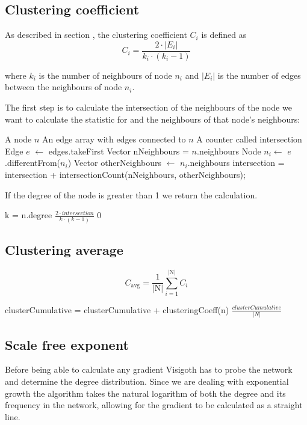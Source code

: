 \documentclass[a4paper,11pt,titlepage]{article}
\begin{document}
\subsection{Clustering coefficient}
As described in section \label{sec:clusteringcoefficient}, the
clustering coefficient $C_i$ is defined as
\[ C_i = \frac{2 \cdot |E_i|}{k_i \cdot (k_i-1)} \]

where $k_i$ is the number of neighbours of node $n_i$ and $|E_i|$ is
the number of edges between the neighbours of node $n_i$.

The first step is to calculate the intersection of the neighbours
of the node we want to calculate the statistic for and the
neighbours of that node's neighbours:

\begin{algorithmic}
  \REQUIRE A node $n$
  \REQUIRE An edge array with edges connected to $n$
  \REQUIRE A counter called intersection
    \STATE Edge $e$ $\gets$ edges.takeFirst
    \STATE Vector nNeighbours = $n$.neighbours
    \STATE Node $n_i \gets$ $e$.differentFrom($n_i$)
    \STATE Vector otherNeighbours $\gets$ $n_i$.neighbours
    \STATE intersection = intersection + intersectionCount(nNeighbours, otherNeighbours);
  \ENDWHILE
\end{algorithmic}

If the degree of the node is greater than 1 we return the calculation.

\begin{algorithmic}
  \REQUIRE k = n.degree
    \RETURN $\frac{2 \cdot intersection}{k \cdot (k-1)}$
  \ELSE
    \RETURN $0$
  \ENDIF
\end{algorithmic}


\subsection{Clustering average}
\[ C_\mathrm{avg} =
   \frac{1}{\mathrm{|N|}}\sum_{i=1}^{\mathrm{|N|}} C_i
\]

\begin{algorithmic}
    \STATE clusterCumulative = clusterCumulative + clusteringCoeff(n)
  \ENDFOR
  \RETURN $\frac{clusterCumulative}{|N|}$
\end{algorithmic}


\subsection{Scale free exponent}
Before being able to calculate any gradient Visigoth has to probe the network
and determine the degree distribution. Since we are dealing with exponential
growth the algorithm takes the natural logarithm of both the degree and its
frequency in the network, allowing for the gradient to be calculated as a
straight line.
\end{document}

